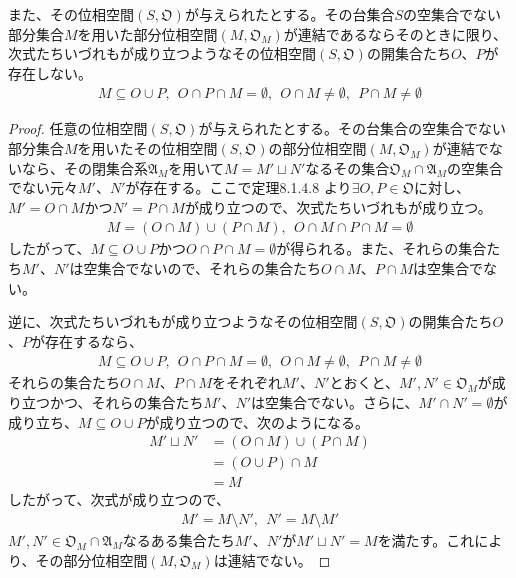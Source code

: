 \documentclass[dvipdfmx]{jsarticle}
\begin{document}
\begin{thm}\label{8.1.5.2}
また、その位相空間$\left( S,\mathfrak{O} \right)$が与えられたとする。その台集合$S$の空集合でない部分集合$M$を用いた部分位相空間$\left( M,\mathfrak{O}_{M} \right)$が連結であるならそのときに限り、次式たちいづれもが成り立つようなその位相空間$\left( S,\mathfrak{O} \right)$の開集合たち$O$、$P$が存在しない。
\begin{align*}
M \subseteq O \cup P,\ \ O \cap P \cap M = \emptyset,\ \ O \cap M \neq \emptyset,\ \ P \cap M \neq \emptyset
\end{align*}
\end{thm}
\begin{proof}
任意の位相空間$\left( S,\mathfrak{O} \right)$が与えられたとする。その台集合の空集合でない部分集合$M$を用いたその位相空間$\left( S,\mathfrak{O} \right)$の部分位相空間$\left( M,\mathfrak{O}_{M} \right)$が連結でないなら、その閉集合系$\mathfrak{A}_{M}$を用いて$M = M' \sqcup N'$なるその集合$\mathfrak{O}_{M} \cap \mathfrak{A}_{M}$の空集合でない元々$M'$、$N'$が存在する。ここで定理8.1.4.8
より$\exists O,P \in \mathfrak{O}$に対し、$M' = O \cap M$かつ$N' = P \cap M$が成り立つので、次式たちいづれもが成り立つ。
\begin{align*}
M = (O \cap M) \cup (P \cap M),\ \ O \cap M \cap P \cap M = \emptyset
\end{align*}
したがって、$M \subseteq O \cup P$かつ$O \cap P \cap M = \emptyset$が得られる。また、それらの集合たち$M'$、$N'$は空集合でないので、それらの集合たち$O \cap M$、$P \cap M$は空集合でない。\par
逆に、次式たちいづれもが成り立つようなその位相空間$\left( S,\mathfrak{O} \right)$の開集合たち$O$、$P$が存在するなら、
\begin{align*}
M \subseteq O \cup P,\ \ O \cap P \cap M = \emptyset,\ \ O \cap M \neq \emptyset,\ \ P \cap M \neq \emptyset
\end{align*}
それらの集合たち$O \cap M$、$P \cap M$をそれぞれ$M'$、$N'$とおくと、$M',N' \in \mathfrak{O}_{M}$が成り立つかつ、それらの集合たち$M'$、$N'$は空集合でない。さらに、$M' \cap N' = \emptyset$が成り立ち、$M \subseteq O \cup P$が成り立つので、次のようになる。
\begin{align*}
M' \sqcup N' &= (O \cap M) \cup (P \cap M)\\
&= (O \cup P) \cap M\\
&= M
\end{align*}
したがって、次式が成り立つので、
\begin{align*}
M' = M \setminus N',\ \ N' = M \setminus M'
\end{align*}
$M',N' \in \mathfrak{O}_{M} \cap \mathfrak{A}_{M}$なるある集合たち$M'$、$N'$が$M' \sqcup N' = M$を満たす。これにより、その部分位相空間$\left( M,\mathfrak{O}_{M} \right)$は連結でない。
\end{proof}
\end{document}
